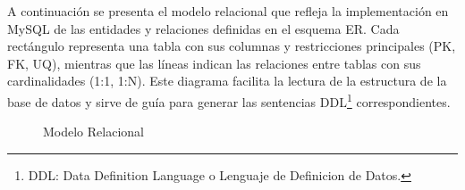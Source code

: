 A continuación se presenta el modelo relacional que refleja la implementación en MySQL de las entidades y relaciones definidas en el esquema ER. Cada rectángulo representa una tabla con sus columnas y restricciones principales (PK, FK, UQ), mientras que las líneas indican las relaciones entre tablas con sus cardinalidades (1:1, 1:N). Este diagrama facilita la lectura de la estructura de la base de datos y sirve de guía para generar las sentencias DDL\footnote{DDL: Data Definition Language o Lenguaje de Definicion de Datos.} correspondientes.
\begin{figure}[H]
  \centering
  \caption{Modelo Relacional}
  \label{fig:classesDiagram}
\end{figure}



